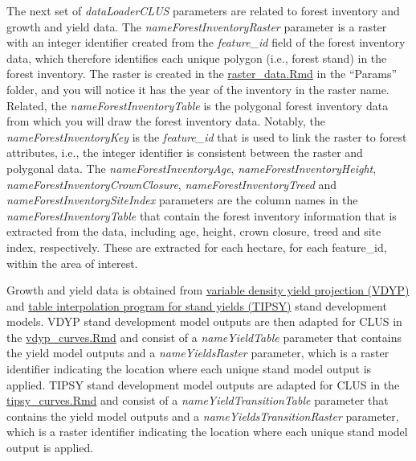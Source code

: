 \documentclass[
]{article}
\begin{document}
The next set of \emph{dataLoaderCLUS} parameters are related to forest
inventory and growth and yield data. The
\emph{nameForestInventoryRaster} parameter is a raster with an integer
identifier created from the \emph{feature\_id} field of the forest
inventory data, which therefore identifies each unique polygon (i.e.,
forest stand) in the forest inventory. The raster is created in the
\href{https://github.com/bcgov/clus/blob/main/R/Params/raster_data.Rmd}{raster\_data.Rmd}
in the ``Params'' folder, and you will notice it has the year of the
inventory in the raster name. Related, the
\emph{nameForestInventoryTable} is the polygonal forest inventory data
from which you will draw the forest inventory data. Notably, the
\emph{nameForestInventoryKey} is the \emph{feature\_id} that is used to
link the raster to forest attributes, i.e., the integer identifier is
consistent between the raster and polygonal data. The
\emph{nameForestInventoryAge}, \emph{nameForestInventoryHeight},
\emph{nameForestInventoryCrownClosure}, \emph{nameForestInventoryTreed}
and \emph{nameForestInventorySiteIndex} parameters are the column names
in the \emph{nameForestInventoryTable} that contain the forest inventory
information that is extracted from the data, including age, height,
crown closure, treed and site index, respectively. These are extracted
for each hectare, for each feature\_id, within the area of interest.

Growth and yield data is obtained from
\href{https://www2.gov.bc.ca/gov/content/industry/forestry/managing-our-forest-resources/forest-inventory/growth-and-yield-modelling/variable-density-yield-projection-vdyp}{variable
density yield projection (VDYP)} and
\href{https://www2.gov.bc.ca/gov/content/industry/forestry/managing-our-forest-resources/forest-inventory/growth-and-yield-modelling/table-interpolation-program-for-stand-yields-tipsy}{table
interpolation program for stand yields (TIPSY)} stand development
models. VDYP stand development model outputs are then adapted for CLUS
in the
\href{https://github.com/bcgov/clus/blob/main/R/Params/vdyp_curves.Rmd}{vdyp\_curves.Rmd}
and consist of a \emph{nameYieldTable} parameter that contains the yield
model outputs and a \emph{nameYieldsRaster} parameter, which is a raster
identifier indicating the location where each unique stand model output
is applied. TIPSY stand development model outputs are adapted for CLUS
in the
\href{https://github.com/bcgov/clus/blob/main/R/Params/tipsy_curves.Rmd}{tipsy\_curves.Rmd}
and consist of a \emph{nameYieldTransitionTable} parameter that contains
the yield model outputs and a \emph{nameYieldsTransitionRaster}
parameter, which is a raster identifier indicating the location where
each unique stand model output is applied.
\end{document}
